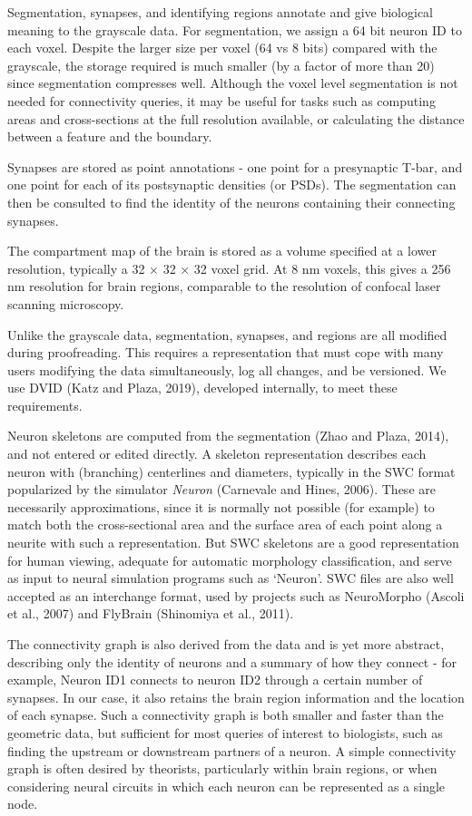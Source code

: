 \documentclass{article}
\begin{document}
Segmentation, synapses, and identifying regions annotate and give biological meaning to the grayscale data. For segmentation, we assign a 64 bit neuron ID to each voxel. Despite the larger size per voxel (64 vs 8 bits) compared with the grayscale, the storage required is much smaller (by a factor of more than 20) since segmentation compresses well. Although the voxel level segmentation is not needed for connectivity queries, it may be useful for tasks such as computing areas and cross-sections at the full resolution available, or calculating the distance between a feature and the boundary.

Synapses are stored as point annotations - one point for a presynaptic T-bar, and one point for each of its postsynaptic densities (or PSDs). The segmentation can then be consulted to find the identity of the neurons containing their connecting synapses.


The compartment map of the brain is stored as a volume specified at a lower resolution, typically a 32 × 32 × 32 voxel grid. At 8 nm voxels, this gives a 256 nm resolution for brain regions, comparable to the resolution of confocal laser scanning microscopy.

Unlike the grayscale data, segmentation, synapses, and regions are all modified during proofreading. This requires a representation that must cope with many users modifying the data simultaneously, log all changes, and be versioned. We use DVID (Katz and Plaza, 2019), developed internally, to meet these requirements.

Neuron skeletons are computed from the segmentation (Zhao and Plaza, 2014), and not entered or edited directly. A skeleton representation describes each neuron with (branching) centerlines and diameters, typically in the SWC format popularized by the simulator \emph{Neuron} (Carnevale and Hines, 2006). These are necessarily approximations, since it is normally not possible (for example) to match both the cross-sectional area and the surface area of each point along a neurite with such a representation. But SWC skeletons are a good representation for human viewing, adequate for automatic morphology classification, and serve as input to neural simulation programs such as ‘Neuron’. SWC files are also well accepted as an interchange format, used by projects such as NeuroMorpho (Ascoli et al., 2007) and FlyBrain (Shinomiya et al., 2011).

The connectivity graph is also derived from the data and is yet more abstract, describing only the identity of neurons and a summary of how they connect - for example, Neuron ID1 connects to neuron ID2 through a certain number of synapses. In our case, it also retains the brain region information and the location of each synapse. Such a connectivity graph is both smaller and faster than the geometric data, but sufficient for most queries of interest to biologists, such as finding the upstream or downstream partners of a neuron. A simple connectivity graph is often desired by theorists, particularly within brain regions, or when considering neural circuits in which each neuron can be represented as a single node.
\end{document}
